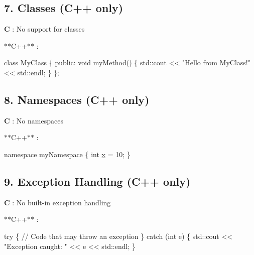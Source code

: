 \subsection*{7. Classes (C++ only)}


\begin{DoxyItemize}
\item {\bfseries C} \+: No support for classes
\item $\ast$$\ast$\+C++$\ast$$\ast$ \+: 
\begin{DoxyCode}
\textcolor{keyword}{class }MyClass \{
\textcolor{keyword}{public}:
    \textcolor{keywordtype}{void} myMethod() \{
        std::cout << \textcolor{stringliteral}{"Hello from MyClass!"} << std::endl;
    \}
\};
\end{DoxyCode}

\end{DoxyItemize}

\subsection*{8. Namespaces (C++ only)}


\begin{DoxyItemize}
\item {\bfseries C} \+: No namespaces
\item $\ast$$\ast$\+C++$\ast$$\ast$ \+: 
\begin{DoxyCode}
\textcolor{keyword}{namespace }myNamespace \{
    \textcolor{keywordtype}{int} \hyperlink{addition_8c_a6150e0515f7202e2fb518f7206ed97dc}{x} = 10;
\}
\end{DoxyCode}

\end{DoxyItemize}

\subsection*{9. Exception Handling (C++ only)}


\begin{DoxyItemize}
\item {\bfseries C} \+: No built-\/in exception handling
\item $\ast$$\ast$\+C++$\ast$$\ast$ \+: 
\begin{DoxyCode}
\textcolor{keywordflow}{try} \{
    \textcolor{comment}{// Code that may throw an exception}
\} \textcolor{keywordflow}{catch} (\textcolor{keywordtype}{int} e) \{
    std::cout << \textcolor{stringliteral}{"Exception caught: "} << e << std::endl;
\}
\end{DoxyCode}

\end{DoxyItemize}

